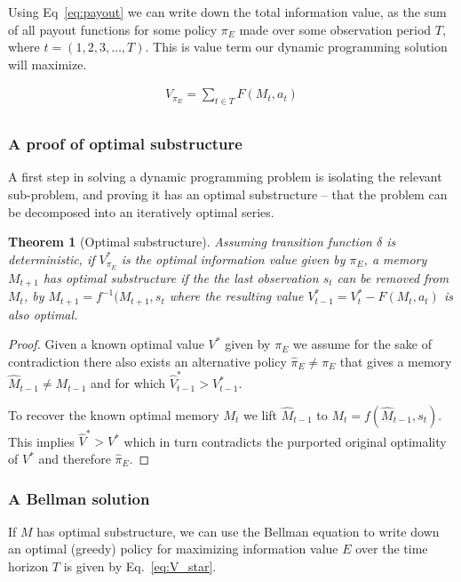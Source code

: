 \documentclass[9pt,twocolumn,twoside]{pnas-new}
\newtheorem{theorem}{Theorem}
\begin{document}
Using Eq~\ref{eq:payout} we can write down the total information value, as the sum of all payout functions for some policy $\pi_E$ made over some observation period $T$, where $t = (1,2,3,\ldots,T)$. This is value term our dynamic programming solution will maximize.

\begin{equation} \label{eq:V}
    \begin{split}
        V_{\pi_E} = \sum_{t \in T} F(M_{t}, a_t)\\
    \end{split}
\end{equation}

\subsubsection*{A proof of optimal substructure}
A first step in solving a dynamic programming problem is isolating the relevant sub-problem, and proving it has an optimal substructure -- that the problem can be decomposed into an iteratively optimal series. 

\begin{theorem}[Optimal substructure] \label{theorem:opt_sub}
    Assuming transition function $\delta$ is deterministic, if $V^*_{\pi_E}$ is the optimal information value given by $\pi_E$, a memory $M_{t+1}$ has optimal substructure if the the last observation $s_t$ can be removed from $M_t$, by $M_{t+1} = f^{-1}(M_{t+1}, s_t$ where the resulting value $V^*_{t-1} = V^*_{t} - F(M_t, a_t)$ is also optimal. 
\end{theorem}
\begin{proof}
    Given a known optimal value $V^*$ given by $\pi_E$ we assume for the sake of contradiction there also exists an alternative policy $\hat \pi_E \neq \pi_E$ that gives a memory $\hat M_{t-1} \neq M_{t-1}$ and for which $\hat V^*_{t-1} > V^*_{t-1}$. 

    To recover the known optimal memory $M_t$ we lift $\hat M_{t-1}$ to $M_t = f(\hat M_{t-1}, s_t)$. This implies $\hat V^* > V^*$ which in turn contradicts the purported original optimality of $V^*$ and therefore $\hat \pi_E$.
\end{proof}


\subsubsection*{A Bellman solution}
If $M$ has optimal substructure, we can use the Bellman equation \cite{Bellman} to write down an optimal (greedy) policy for maximizing information value $E$ over the time horizon $T$ is given by Eq.~\ref{eq:V_star}.
\end{document}
